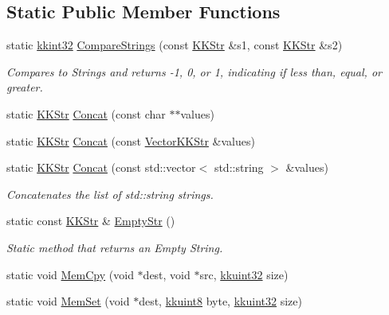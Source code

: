 \subsection*{Static Public Member Functions}
\begin{DoxyCompactItemize}
\item 
static \hyperlink{namespace_k_k_b_a8fa4952cc84fda1de4bec1fbdd8d5b1b}{kkint32} \hyperlink{class_k_k_b_1_1_k_k_str_a8a8d48473993237d9a7d62baebacc99b}{Compare\+Strings} (const \hyperlink{class_k_k_b_1_1_k_k_str}{K\+K\+Str} \&s1, const \hyperlink{class_k_k_b_1_1_k_k_str}{K\+K\+Str} \&s2)
\begin{DoxyCompactList}\small\item\em Compares to Strings and returns -\/1, 0, or 1, indicating if less than, equal, or greater. \end{DoxyCompactList}\item 
static \hyperlink{class_k_k_b_1_1_k_k_str}{K\+K\+Str} \hyperlink{class_k_k_b_1_1_k_k_str_a1428ca8eb3d0bbe4139ba4834ae06176}{Concat} (const char $\ast$$\ast$values)
\item 
static \hyperlink{class_k_k_b_1_1_k_k_str}{K\+K\+Str} \hyperlink{class_k_k_b_1_1_k_k_str_ab0f66b6d25b930821ebc7db21e5445c3}{Concat} (const \hyperlink{class_k_k_b_1_1_vector_k_k_str}{Vector\+K\+K\+Str} \&values)
\item 
static \hyperlink{class_k_k_b_1_1_k_k_str}{K\+K\+Str} \hyperlink{class_k_k_b_1_1_k_k_str_ac9ff5c7963e86138a378cc20d28924ef}{Concat} (const std\+::vector$<$ std\+::string $>$ \&values)
\begin{DoxyCompactList}\small\item\em Concatenates the list of \textquotesingle{}std\+::string\textquotesingle{} strings. \end{DoxyCompactList}\item 
static const \hyperlink{class_k_k_b_1_1_k_k_str}{K\+K\+Str} \& \hyperlink{class_k_k_b_1_1_k_k_str_ab6e416b3ef54ef632bd10c3f7a2f7994}{Empty\+Str} ()
\begin{DoxyCompactList}\small\item\em Static method that returns an Empty String. \end{DoxyCompactList}\item 
static void \hyperlink{class_k_k_b_1_1_k_k_str_a0da18b355db60d8b377259057d9e72af}{Mem\+Cpy} (void $\ast$dest, void $\ast$src, \hyperlink{namespace_k_k_b_af8d832f05c54994a1cce25bd5743e19a}{kkuint32} size)
\item 
static void \hyperlink{class_k_k_b_1_1_k_k_str_afaa6fdfb8b464e1f925a80ac744cf037}{Mem\+Set} (void $\ast$dest, \hyperlink{namespace_k_k_b_aebd95e29140dd9220a04bee9cabd648e}{kkuint8} byte, \hyperlink{namespace_k_k_b_af8d832f05c54994a1cce25bd5743e19a}{kkuint32} size)
$$
\end{DoxyCompactItemize}
